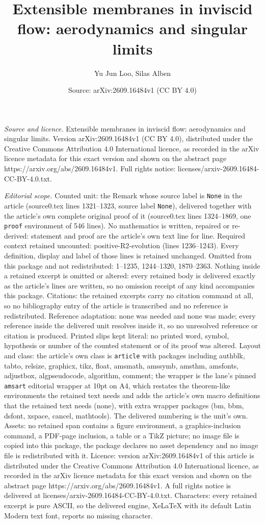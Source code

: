 \documentclass[10pt,a4paper]{amsart}
\title[Extensible membranes in inviscid flow: aerodynamics and sing]{Extensible membranes in inviscid flow: aerodynamics and singular limits}
\author{Yu Jun Loo, Silas Alben}
\date{Source: arXiv:2609.16484v1 (CC BY 4.0)}
\begin{document}
\maketitle

\noindent\emph{Source and licence.} Extensible membranes in inviscid flow: aerodynamics and singular limits. Version arXiv:2609.16484v1 (CC BY 4.0), distributed under the Creative Commons Attribution 4.0 International licence, as recorded in the arXiv licence metadata for this exact version and shown on the abstract page https://arxiv.org/abs/2609.16484v1. Full rights notice: licenses/arxiv-2609.16484-CC-BY-4.0.txt.\par\smallskip

\noindent\textit{Editorial scope.} Counted unit: the Remark whose source label is \texttt{None} in the article (source0.tex lines 1321--1323, source label \texttt{None}), delivered together with the article's own complete original proof of it (source0.tex lines 1324--1869, one \texttt{proof} environment of 546 lines). No mathematics is written, repaired or re-derived: statement and proof are the article's own text line for line. Required context retained uncounted: positive-R2-evolution (lines 1236--1243). Every definition, display and label of those lines is retained unchanged. Omitted from this package and not redistributed: 1--1235, 1244--1320, 1870--2363. Nothing inside a retained excerpt is omitted or altered: every retained body is delivered exactly as the article's lines are written, so no omission receipt of any kind accompanies this package. Citations: the retained excerpts carry no citation command at all, so no bibliography entry of the article is transcribed and no reference is redistributed. Reference adaptation: none was needed and none was made; every reference inside the delivered unit resolves inside it, so no unresolved reference or citation is produced. Printed slips kept literal: no printed word, symbol, hypothesis or number of the counted statement or of its proof was altered. Layout and class: the article's own class is \texttt{article} with packages including authblk, tabto, relsize, graphicx, tikz, float, amsmath, amssymb, amsthm, amsfonts, adjustbox, algpseudocode, algorithm, comment; the wrapper is the lane's pinned \texttt{amsart} editorial wrapper at 10pt on A4, which restates the theorem-like environments the retained text needs and adds the article's own macro definitions that the retained text needs (none), with extra wrapper packages (bm, bbm, dsfont, xspace, cancel, mathtools). The delivered numbering is the unit's own. Assets: no retained span contains a figure environment, a graphics-inclusion command, a PDF-page inclusion, a table or a TikZ picture; no image file is copied into this package, the package declares no asset dependency and no image file is redistributed with it. Licence: version arXiv:2609.16484v1 of this article is distributed under the Creative Commons Attribution 4.0 International licence, as recorded in the arXiv licence metadata for this exact version and shown on the abstract page https://arxiv.org/abs/2609.16484v1. A full rights notice is delivered at licenses/arxiv-2609.16484-CC-BY-4.0.txt. Characters: every retained excerpt is pure ASCII, so the delivered engine, XeLaTeX with its default Latin Modern text font, reports no missing character.
\end{document}
